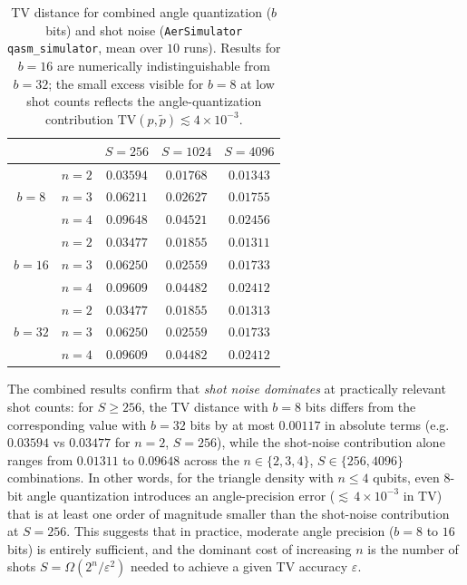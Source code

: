 \documentclass{article}
\numberwithin{equation}{section}
\begin{document}
\begin{table}[h]
\centering
\begin{tabular}{cc|ccc}
& & $S=256$ & $S=1024$ & $S=4096$ \\
\hline
\multirow{3}{*}{$b=8$}
& $n=2$ & $0.03594$ & $0.01768$ & $0.01343$ \\
& $n=3$ & $0.06211$ & $0.02627$ & $0.01755$ \\
& $n=4$ & $0.09648$ & $0.04521$ & $0.02456$ \\
\hline
\multirow{3}{*}{$b=16$}
& $n=2$ & $0.03477$ & $0.01855$ & $0.01311$ \\
& $n=3$ & $0.06250$ & $0.02559$ & $0.01733$ \\
& $n=4$ & $0.09609$ & $0.04482$ & $0.02412$ \\
\hline
\multirow{3}{*}{$b=32$}
& $n=2$ & $0.03477$ & $0.01855$ & $0.01313$ \\
& $n=3$ & $0.06250$ & $0.02559$ & $0.01733$ \\
& $n=4$ & $0.09609$ & $0.04482$ & $0.02412$ \\
\end{tabular}
\caption{TV distance for combined angle quantization ($b$ bits) and shot noise
(\texttt{AerSimulator} \texttt{qasm\_simulator}, mean over $10$ runs).
Results for $b=16$ are numerically indistinguishable from $b=32$; the small
excess visible for $b=8$ at low shot counts reflects the angle-quantization
contribution $\mathrm{TV}(p,\tilde{p})\lesssim 4\times 10^{-3}$.}
\label{tab:tv_combined}
\end{table}

The combined results confirm that \emph{shot noise dominates} at practically relevant shot
counts: for $S\ge 256$, the TV distance with $b=8$ bits differs from the
corresponding value with $b=32$ bits by at most $0.00117$ in absolute terms
(e.g.\ $0.03594$ vs $0.03477$ for $n=2$, $S=256$), while the
shot-noise contribution alone ranges from $0.01311$ to $0.09648$ across the $n\in\{2,3,4\}$,
$S\in\{256,4096\}$ combinations.
In other words, for the triangle density with $n\le 4$ qubits, even $8$-bit angle
quantization introduces an angle-precision error (${\lesssim}\,4\times10^{-3}$ in TV) that is at least
one order of magnitude smaller than the shot-noise contribution at $S=256$.
This suggests that in practice, moderate angle precision ($b=8$ to $16$ bits) is entirely
sufficient, and the dominant cost of increasing $n$ is the number of shots $S=\Omega(2^n/\varepsilon^2)$
needed to achieve a given TV accuracy $\varepsilon$.
\end{document}
